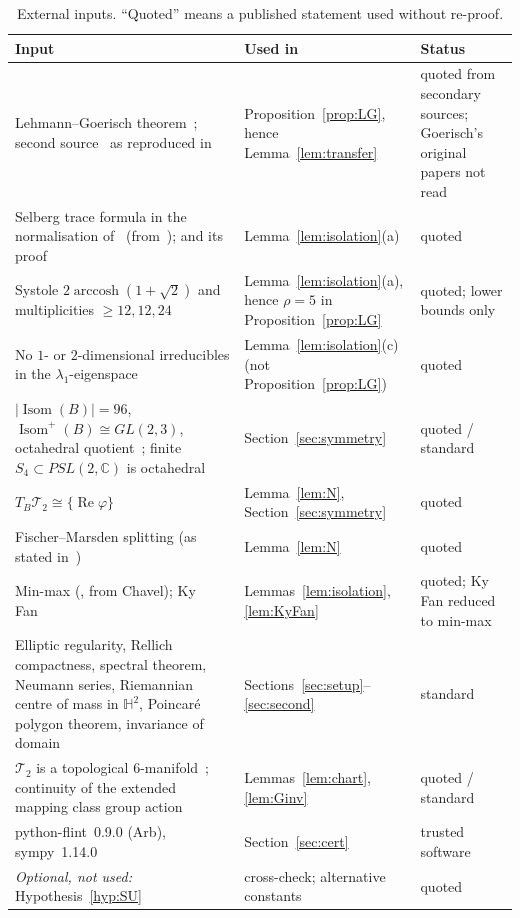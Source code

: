 \documentclass[11pt]{amsart}
\theoremstyle{definition}
\theoremstyle{remark}
\newcommand{\C}{\mathbb{C}}
\newcommand{\Hyp}{\mathbb{H}^2}
\newcommand{\Teich}{\mathcal{T}_2}
\newcommand{\Isom}{\operatorname{Isom}}
\newcommand{\arccosh}{\operatorname{arccosh}}
\begin{document}
\begin{table}[!htbp]
\caption{External inputs. ``Quoted'' means a published statement used without re-proof.}
\label{tab:deps}
\small
\begin{tabular}{@{}p{}p{}p{}@{}}
\toprule
Input & Used in & Status\\
\midrule
Lehmann--Goerisch theorem~\cite[Thms.~4.1, 4.3]{LiuPlum}; second source~\cite[Thm.~2.1]{BMPW} as reproduced in~\cite[\S2]{Vej18} &
Proposition~\ref{prop:LG}, hence Lemma~\ref{lem:transfer} & quoted from secondary sources; Goerisch's original papers not read\\
Selberg trace formula in the normalisation of~\cite[(3.1)]{FBP-K} (from~\cite{Bus10});
\cite[Lemma~3.2]{FBP-K} and its proof & Lemma~\ref{lem:isolation}(a) & quoted\\
Systole $2\arccosh(1+\sqrt2)$ and multiplicities $\ge12,12,24$~\cite[\S7.4]{FBP-K} & Lemma~\ref{lem:isolation}(a), hence $\rho=5$ in Proposition~\ref{prop:LG} & quoted; lower bounds only\\
No $1$- or $2$-dimensional irreducibles in the $\lambda_1$-eigenspace~\cite[Lemmas~7.2--7.3]{FBP-K} & Lemma~\ref{lem:isolation}(c) (not Proposition~\ref{prop:LG}) & quoted\\
$|\Isom(B)|=96$, $\Isom^+(B)\cong GL(2,3)$, octahedral quotient~\cite[\S7.1]{FBP-K}; finite $S_4\subset PSL(2,\C)$ is octahedral & Section~\ref{sec:symmetry} & quoted / standard\\
$T_B\Teich\cong\{\operatorname{Re}\varphi\}$~\cite{Maz,Tro92,DW} & Lemma~\ref{lem:N}, Section~\ref{sec:symmetry} & quoted\\
Fischer--Marsden splitting (as stated in~\cite[Rem.~3.3]{Maz}) & Lemma~\ref{lem:N} & quoted\\
Min-max (\cite[Thm.~1.22]{Coo18}, from Chavel); Ky Fan~\cite{Mos,Fan49,Fan50} & Lemmas~\ref{lem:isolation}, \ref{lem:KyFan} & quoted; Ky Fan reduced to min-max\\
Elliptic regularity, Rellich compactness, spectral theorem, Neumann series, Riemannian centre of
mass in $\Hyp$, Poincar\'e polygon theorem, invariance of domain & Sections~\ref{sec:setup}--\ref{sec:second} & standard\\
$\Teich$ is a topological $6$-manifold~\cite{FN}; continuity of the extended mapping class group action & Lemmas~\ref{lem:chart}, \ref{lem:Ginv} & quoted / standard\\
python-flint~0.9.0 (Arb), sympy~1.14.0 & Section~\ref{sec:cert} & trusted software\\
\midrule
\emph{Optional, not used:} Hypothesis~\ref{hyp:SU}~\cite[\S5]{SU13} & cross-check; alternative constants & quoted\\
\bottomrule
\end{tabular}
\end{table}
\end{document}
